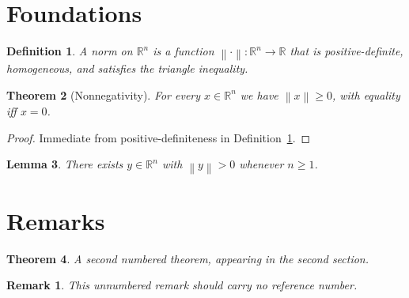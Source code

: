\documentclass{article}
\newtheorem{theorem}{Theorem}[section]
\newtheorem{lemma}[theorem]{Lemma}
\newtheorem{definition}[theorem]{Definition}
\newtheorem*{remark}{Remark}
\newcommand{\R}{\mathbb{R}}
\newcommand{\norm}[1]{\left\lVert #1 \right\rVert}
\begin{document}
\section{Foundations}

\begin{definition}\label{def:norm}
A \emph{norm} on $\R^n$ is a function $\norm{\cdot} : \R^n \to \R$ that is
positive-definite, homogeneous, and satisfies the triangle inequality.
\end{definition}

\begin{theorem}[Nonnegativity]\label{thm:main}
For every $x \in \R^n$ we have $\norm{x} \geq 0$, with equality iff $x = 0$.
\end{theorem}

\begin{proof}
Immediate from positive-definiteness in Definition~\ref{def:norm}.
\end{proof}

\begin{lemma}\label{lem:aux}
There exists $y \in \R^n$ with $\norm{y} > 0$ whenever $n \geq 1$.
\end{lemma}

\section{Remarks}

\begin{theorem}
A second numbered theorem, appearing in the second section.
\end{theorem}

\begin{remark}
This unnumbered remark should carry no reference number.
\end{remark}
\end{document}
